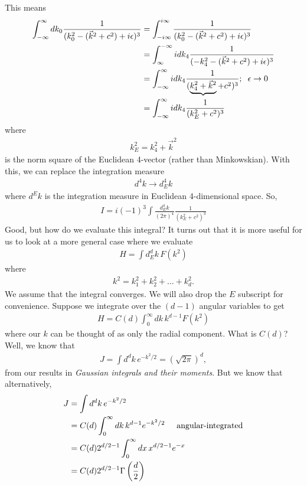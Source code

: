 \documentclass{book}
\theoremstyle{definition}
\newcommand{\f}[2]{\frac{#1}{#2}}
\newcommand{\lp}{\left(}
\newcommand{\rp}{\right)}
\begin{document}
This means
\begin{align}
\int^\infty_{-\infty} dk_0 \f{1}{(k_0^2 - (\vec{k}^2 + c^2)+ i\epsilon)^3} &= \int^{i\infty}_{-i\infty}\f{1}{(k_0^2 - (\vec{k}^2 + c^2)+ i\epsilon)^3} \nonumber\\
&= \int^{-\infty}_{\infty}idk_4\f{1}{(-k_4^2 - (\vec{k}^2 + c^2)+ i\epsilon)^3} \nonumber\\
&= \int^{\infty}_{-\infty}idk_4\f{1}{(\underbrace{k_4^2 + \vec{k}^2} + c^2)^3}; \hspace{0.2cm}\epsilon\to 0 \nonumber\\
&= \int^{\infty}_{-\infty}idk_4\f{1}{(k^2_E + c^2)^3}
\end{align}
where 
\begin{align}
k^2_E = k_4^2 + \vec{k}^2
\end{align}
is the norm square of the Euclidean 4-vector (rather than Minkowskian). With this, we can replace the integration measure
\begin{align}
d^4k \to d^4_Ek
\end{align}
where $d^E k$ is the integration measure in Euclidean 4-dimensional space. So,
\begin{align}
\boxed{I = i(-1)^3\int \f{d^4_E k}{(2\pi)^4} \f{1}{(k^2_E + c^2)^3}}
\end{align}
Good, but how do we evaluate this integral? It turns out that it is more useful for us to look at a more general case where we evaluate
\begin{align}
H = \int d^d_Ek \, F(k^2)
\end{align}
where
\begin{align}
k^2 = k_1^2 + k_2^2 + \dots + k^2_d.
\end{align}
We assume that the integral converges. We will also drop the $E$ subscript for convenience. Suppose we integrate over the $(d-1)$ angular variables to get
\begin{align}
H = C(d)\int^\infty_0 dk\,k^{d-1}F(k^2)
\end{align}
where our $k$ can be thought of as only the radial component. What is $C(d)$? Well, we know that
\begin{align}
J = \int d^dk\, e^{-k^2/2} = \lp\sqrt{2\pi}\rp^d,
\end{align}
from our results in \textit{Gaussian integrals and their moments}. But we know that alternatively,
\begin{align}
J &= \int d^dk\, e^{-k^2/2}\nonumber\\
&= C(d) \int^\infty_0 dk\, k^{d-1}e^{-k^2/2} \hspace{0.5cm}\text{angular-integrated} \nonumber\\
&= C(d) 2^{d/2 - 1} \int^\infty_0 dx\, x^{d/2 - 1}e^{-x} \nonumber\\
&= C(d) 2^{d/2 - 1} \Gamma\lp \f{d}{2} \rp
\end{align}
\end{document}

